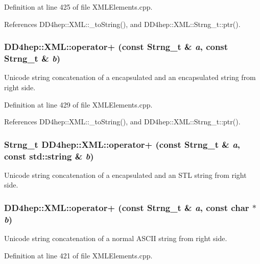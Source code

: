 Definition at line 425 of file XMLElements.cpp.

References DD4hep::XML::\_\-toString(), and DD4hep::XML::Strng\_\-t::ptr().\hypertarget{group___d_d4_h_e_p___x_m_l_ga16907b7f06827dc354d29834328834f8}{
\subsubsection[{operator+}]{ DD4hep::XML::operator+ (const {\bf Strng\_\-t} \& {\em a}, \/  const {\bf Strng\_\-t} \& {\em b})}}
\label{group___d_d4_h_e_p___x_m_l_ga16907b7f06827dc354d29834328834f8}


Unicode string concatenation of a encapsulated and an encapsulated string from right side. 

Definition at line 429 of file XMLElements.cpp.

References DD4hep::XML::\_\-toString(), and DD4hep::XML::Strng\_\-t::ptr().\hypertarget{group___d_d4_h_e_p___x_m_l_gaf514b02eb314678df1b7149c4f0025b2}{
\subsubsection[{operator+}]{\setlength{\rightskip}{0pt plus 5cm}Strng\_\-t DD4hep::XML::operator+ (const Strng\_\-t \& {\em a}, \/  const std::string \& {\em b})}}
\label{group___d_d4_h_e_p___x_m_l_gaf514b02eb314678df1b7149c4f0025b2}


Unicode string concatenation of a encapsulated and an STL string from right side. \hypertarget{group___d_d4_h_e_p___x_m_l_gad7c5e5c9ad994b97f08eec6e7829e23f}{
\subsubsection[{operator+}]{ DD4hep::XML::operator+ (const {\bf Strng\_\-t} \& {\em a}, \/  const char $\ast$ {\em b})}}
\label{group___d_d4_h_e_p___x_m_l_gad7c5e5c9ad994b97f08eec6e7829e23f}


Unicode string concatenation of a normal ASCII string from right side. 

Definition at line 421 of file XMLElements.cpp.

